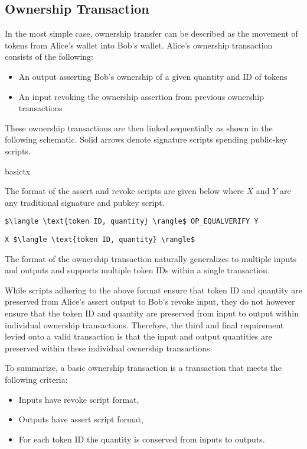 \documentclass[9pt,oneside]{amsart}
\begin{document}
\begin{multicols}{2}
\subsection{Ownership Transaction}\label{subsec:basicownershiptx}
In the most simple case, ownership transfer can be described as the movement of tokens from Alice's wallet into Bob's wallet. Alice's ownership transaction consists of the following:
\begin{itemize}
    \item An output asserting Bob's ownership of a given quantity and ID of tokens
    \item An input revoking the ownership assertion from previous ownership transactions
\end{itemize}

These ownership transactions are then linked sequentially as shown in the following schematic. Solid arrows denote signature scripts spending public-key scripts.
\begin{center}
{basictx}
\end{center}

The format of the assert and revoke scripts are given below where $X$ and $Y$ are any traditional signature and pubkey script.

\begin{lstlisting}[title={\textbf{Alice's Assert PubKey Script}}]
$\langle \text{token ID, quantity} \rangle$ OP_EQUALVERIFY Y
\end{lstlisting}

\begin{lstlisting}[title={\textbf{Bob's Revoke Signature Script}}]
X $\langle \text{token ID, quantity} \rangle$
\end{lstlisting}

The format of the ownership transaction naturally generalizes to multiple inputs and outputs and supports multiple token IDs within a single transaction.

While scripts adhering to the above format ensure that token ID and quantity are preserved from Alice's assert output to Bob's revoke input, they do not however ensure that the token ID and quantity are preserved from input to output within individual ownership transactions. Therefore, the third and final requirement levied onto a valid transaction is that the input and output quantities are preserved within these individual ownership transactions.

To summarize, a basic ownership transaction is a transaction that meets the following criteria:
\begin{itemize}
    \item Inputs have revoke script format,
    \item Outputs have assert script format,
    \item For each token ID the quantity is conserved from inputs to outputs.
\end{itemize}


\end{multicols}
\end{document}
